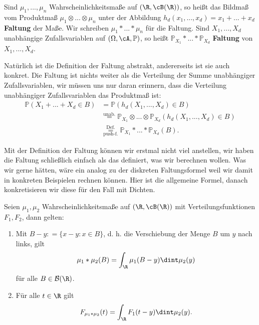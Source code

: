 \begin{deff}
	Sind $\mu_1,...,\mu_n$ Wahrscheinlichkeitsmaße auf $(\R, \cB(\R))$, so heißt das Bildmaß vom Produktmaß $\mu_1 \otimes ... \otimes \mu_n$ unter der Abbildung $h_d(x_1,...,x_d) = x_1+...+x_d$ \textbf{Faltung} der Maße. Wir schreiben $\mu_1 *...* \mu_n$ für die Faltung.
	Sind $X_1,...,X_d$ unabhängige Zufallsvariablen auf $(\Omega, \cA, \mathbb{P})$, so heißt $\mathbb{P}_{X_1} *...*\mathbb{P}_{X_d}$ \textbf{Faltung} von $X_1, ..., X_d$.
\end{deff}

\begin{bem}
	Nat\"urlich ist die Definition der Faltung abstrakt, andererseits ist sie auch konkret. Die Faltung ist nichts weiter als die Verteilung der Summe unabh\"angiger Zufallsvariablen, wir m\"ussen uns nur daran erinnern, dass die Verteilung unabh\"angiger Zufallsvariablen das Produktma\ss{} ist:
	\begin{align*}
		\mathbb{P}(X_1+...+X_d \in B) &= \mathbb{P}(h_d(X_1,...,X_d) \in B) \\
		&\overset{\text{unab.}}{=} \mathbb{P}_{X_1} \otimes ... \otimes \mathbb{P}_{X_d}(h_d(X_1,...,X_d) \in B)\\
		&\overset{\text{Def.}}{\underset{\text{push-f.}}{=}} \mathbb{P}_{X_1} *...*\mathbb{P}_{X_d}(B).
	\end{align*}
\end{bem}
Mit der Definition der Faltung k\"onnen wir erstmal nicht viel anstellen, wir haben die Faltung schlie\ss lich einfach als das definiert, was wir berechnen wollen. Was wir gerne h\"atten, w\"are ein analog zu der diskreten Faltungsformel weil wir damit in konkreten Beispielen rechnen k\"onnen. Hier ist die allgemeine Formel, danach konkretisieren wir diese f\"ur den Fall mit Dichten.
\begin{prop}\label{randomProp}
	Seien $\mu_1,\mu_2$ Wahrscheinlichkeitsmaße auf $(\R,\cB(\R))$ mit Verteilungsfunktionen $F_1,F_2$, dann gelten:
	\begin{enumerate}[label=(\roman*)]
		\item Mit $B-y: = \{ x-y\colon x \in B \}$, d. h. die Verschiebung der Menge $B$ um $y$ nach links, gilt \[ \mu_1 * \mu_2(B) = \int_{\R} \mu_1(B-y) \dint \mu_2(y)\] f\"ur alle $B\in \mathcal B(\R)$.
		\item F\"ur alle $t\in \R$ gilt \[ F_{\mu_1 * \mu_2}(t) = \int_{\R} F_1(t-y) \dint \mu_2(y).\]
	\end{enumerate}
\end{prop}

